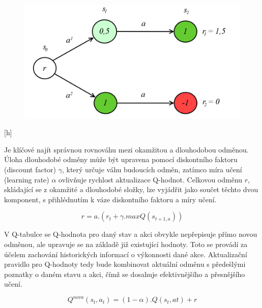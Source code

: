 \documentclass[12pt, a4paper,
twoside,        %
openright
]{report}
\begin{document}
\begin{figure}[h]
	\centering
	\includegraphics[width=0.8\linewidth, height=0.8\linewidth, keepaspectratio]{image/odmen.png}
\end{figure}[h]

Je klíčové najít správnou rovnováhu mezi okamžitou a dlouhodobou odměnou. Úloha dlouhodobé odměny může být upravena pomocí diskontního faktoru (discount factor) \(\gamma\), který určuje váhu budoucích odměn, zatímco míra učení (learning rate) \(\alpha\) ovlivňuje rychlost aktualizace Q-hodnot. Celkovou odměnu \(r\), skládající se z okamžité a dlouhodobé složky, lze vyjádřit jako součet těchto dvou komponent, s přihlédnutím k váze diskontního faktoru a míry učení.

\begin{equation}
	r=a.(r_{t}+\gamma . maxQ(s_{t+1,a}))
\end{equation}



V Q-tabulce se Q-hodnota pro daný stav a akci obvykle nepřepisuje přímo novou odměnou, ale upravuje se na základě již existující hodnoty. Toto se provádí za účelem zachování historických informací o výkonnosti dané akce. Aktualizační pravidlo pro Q-hodnoty tedy bude kombinovat aktuální odměnu s předešlými poznatky o daném stavu a akci, čímž se dosahuje efektivnějšího a přesnějšího učení.

\begin{equation}
	Q^{nova}(s_t,a_t)=(1-\alpha).Q(s_{t},a{t})+r
\end{equation}
\end{document}
